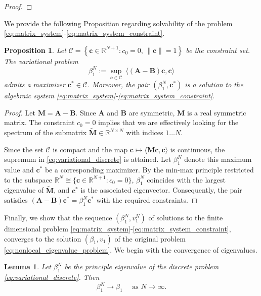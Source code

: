 \documentclass[11pt, a4paper]{article}
\theoremstyle{break}
\theoremstyle{break}
\newtheorem{prp}{Proposition}[section]
\theoremstyle{break}
\theoremstyle{break}
\theoremstyle{break}
\newtheorem{lem}{Lemma}[section]
\theoremstyle{break}
\theoremstyle{break}
\theoremstyle{break}
\theoremstyle{break}
\theoremstyle{break}
\begin{document}
\begin{proof}
\end{proof}

We provide the following Proposition regarding solvability of the problem \eqref{eq:matrix_system}-\eqref{eq:matrix_system_constraint}.
\begin{prp}
    \label{prp:finite_dimensional_minimizer}
    Let $\mathcal{C} = \left\{ \mathbf{c} \in \mathbb{R}^{N+1} : c_0 = 0, \, \|\mathbf{c}\| = 1 \right\}$ be the constraint set. 
    The variational problem
    \begin{equation}
        \label{eq:variational_discrete}
        \beta_1^N := \sup_{\mathbf{c} \in \mathcal{C}} \: \langle (\mathbf{A} - \mathbf{B}) \mathbf{c}, \mathbf{c} \rangle
    \end{equation}
    admits a maximizer $\mathbf{c}^* \in \mathcal{C}$. Moreover, the pair $(\beta_1^N, \mathbf{c}^*)$ is a solution to the algebraic system \eqref{eq:matrix_system}-\eqref{eq:matrix_system_constraint}.
\end{prp}

\begin{proof}
    Let $\mathbf{M} = \mathbf{A} - \mathbf{B}$. Since $\mathbf{A}$ and $\mathbf{B}$ are symmetric, $\mathbf{M}$ is a real symmetric matrix. The constraint $c_0=0$ implies that we are effectively looking for the spectrum of the submatrix $\tilde{\mathbf{M}} \in \mathbb{R}^{N \times N}$ with indices $1 \dots N$.
    
    Since the set $\mathcal{C}$ is compact and the map $\mathbf{c} \mapsto \langle \mathbf{M}\mathbf{c}, \mathbf{c}\rangle$ is continuous, the supremum in \eqref{eq:variational_discrete} is attained. Let $\beta_1^N$ denote this maximum value and $\mathbf{c}^*$ be a corresponding maximizer. By the min-max principle restricted to the subspace $\mathbb{R}^N \cong \{ \mathbf{c} \in \mathbb{R}^{N+1} : c_0=0 \}$, $\beta_1^N$ coincides with the largest eigenvalue of $\tilde{\mathbf{M}}$, and $\mathbf{c}^*$ is the associated eigenvector. Consequently, the pair satisfies $(\mathbf{A}-\mathbf{B})\mathbf{c}^* = \beta_1^N \mathbf{c}^*$ with the required constraints.
\end{proof}

Finally, we show that the sequence $(\beta_1^N, v_1^N)$ of solutions to the finite dimensional problem \eqref{eq:matrix_system}-\eqref{eq:matrix_system_constraint}, converges to the solution $(\beta_1, v_1)$ of the original problem \eqref{eq:nonlocal_eigenvalue_problem}. We begin with the convergence of eigenvalues.

\begin{lem}
    \label{lem:convergence_principle_eigenvalue}
    Let $\beta_1^N$ be the principle eigenvalue of the discrete problem \eqref{eq:variational_discrete}. Then
    \begin{equation*}
        \beta_1^N \rightarrow \beta_1 \quad \text{ as } N \rightarrow \infty.
    \end{equation*}
\end{lem}
\end{document}
